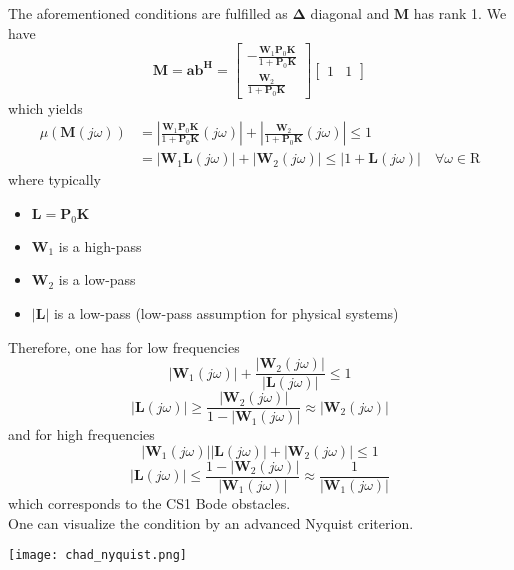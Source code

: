 \begin{examplesection}
    The aforementioned conditions are fulfilled as $\boldsymbol{\Delta}$ diagonal and $\mathbf{M}$ has rank 1. We have
    \begin{equation*}
        \mathbf{M}=\mathbf{ab^H}=\begin{bmatrix}
            -\frac{\mathbf{W}_1\mathbf{P}_0\mathbf{K}}{1+\mathbf{P}_0\mathbf{K}} \\
            \frac{\mathbf{W}_2}{1+\mathbf{P}_0\mathbf{K}}
        \end{bmatrix}
        \begin{bmatrix}
            1 & 1
        \end{bmatrix}
    \end{equation*}
    which yields
    \begin{align*}
        \mu(\mathbf{M}(j\omega)) & =\left|\frac{\mathbf{W}_1\mathbf{P}_0\mathbf{K}}{1+\mathbf{P}_0\mathbf{K}}(j\omega)\right|+\left|\frac{\mathbf{W}_2}{1+\mathbf{P}_0\mathbf{K}}(j\omega)\right|\leq1 \\
                                 & =|\mathbf{W}_1 \mathbf{L}(j\omega)|+|\mathbf{W}_2(j\omega)|\leq|1+\mathbf{L}(j\omega)|\quad\forall\omega\in\mathrm{R}
    \end{align*}
    where typically
    \begin{itemize}
        \item $\mathbf{L}=\mathbf{P}_0 \mathbf{K}$
        \item $\mathbf{W}_1$ is a high-pass
        \item $\mathbf{W}_2$ is a low-pass
        \item $|\mathbf{L}|$ is a low-pass (low-pass assumption for physical systems)
    \end{itemize}
    Therefore, one has for low frequencies
    \begin{equation*}
        |\mathbf{W}_1(j\omega)|+\frac{|\mathbf{W}_2(j\omega)|}{|\mathbf{L}(j\omega)|}\leq1
    \end{equation*}
    \begin{equation*}
        |\mathbf{L}(j\omega)|\geq\frac{|\mathbf{W}_2(j\omega)|}{1-|\mathbf{W}_1(j\omega)|}\approx|\mathbf{W}_2(j\omega)|
    \end{equation*}
    and for high frequencies
    \begin{equation*}
        |\mathbf{W}_1(j\omega)||\mathbf{L}(j\omega)|+|\mathbf{W}_2(j\omega)|\leq1
    \end{equation*}
    \begin{equation*}
        |\mathbf{L}(j\omega)|\leq\frac{1-|\mathbf{W}_2(j\omega)|}{|\mathbf{W}_1(j\omega)|}\approx\frac1{|\mathbf{W}_1(j\omega)|}
    \end{equation*}
    which corresponds to the CS1 Bode obstacles.\\
    One can visualize the condition by an advanced Nyquist criterion.
    \begin{center}
        \texttt{[image: chad\_nyquist.png]}
    \end{center}
\end{examplesection}


